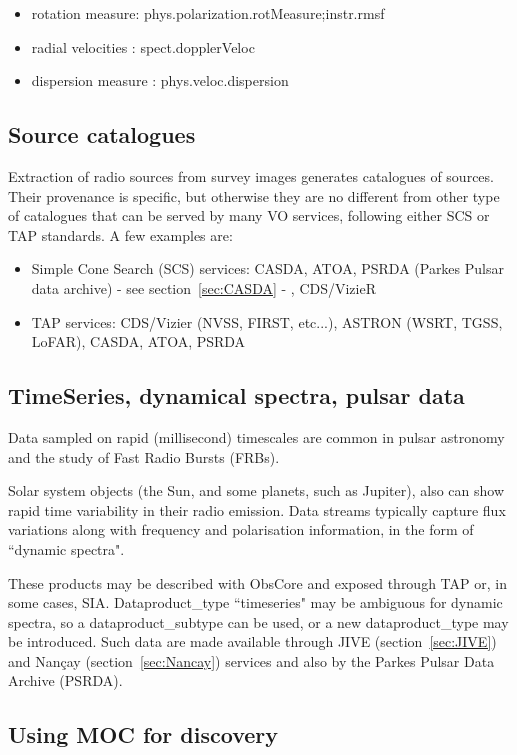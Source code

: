 \documentclass[11pt,a4paper]{ivoa}
\begin{document}
\begin{itemize}
    \item rotation measure: phys.polarization.rotMeasure;instr.rmsf
    \item radial velocities : spect.dopplerVeloc
    \item dispersion measure : phys.veloc.dispersion
\end{itemize}

\subsection{Source catalogues}
Extraction of radio sources from survey images generates catalogues of sources. Their provenance is 
specific, but otherwise they are no different from other type of catalogues that can be served by many 
VO services, following either SCS \citep{std:SCS} or TAP standards. A few examples are:
\begin{itemize}
\item Simple Cone Search (SCS) services: CASDA, ATOA, PSRDA (Parkes Pulsar data archive) - see 
section~\ref{sec:CASDA} - , CDS/VizieR
\item TAP services: CDS/Vizier (NVSS, FIRST, etc...), ASTRON (WSRT, TGSS, LoFAR), CASDA, ATOA, PSRDA 
\end{itemize}


\subsection{TimeSeries, dynamical spectra, pulsar data}

Data sampled on rapid (millisecond) timescales are common in pulsar astronomy and the study of Fast 
Radio Bursts (FRBs). 

Solar system objects (the Sun, and some planets, such as Jupiter), also can show rapid time variability 
in their radio emission. Data streams typically capture flux variations along with frequency and 
polarisation information, in the form of ``dynamic spectra".

These products may be described with ObsCore and exposed through TAP or, in some cases, SIA. 
Dataproduct\_type ``timeseries" may be ambiguous for dynamic spectra, so a dataproduct\_subtype can be 
used, or a new dataproduct\_type may be introduced. Such data are made available through JIVE 
(section~\ref{sec:JIVE}) and Nan\c cay (section~\ref{sec:Nancay}) services and also by the Parkes Pulsar 
Data Archive (PSRDA).


\subsection{Using MOC for discovery}
\end{document}
